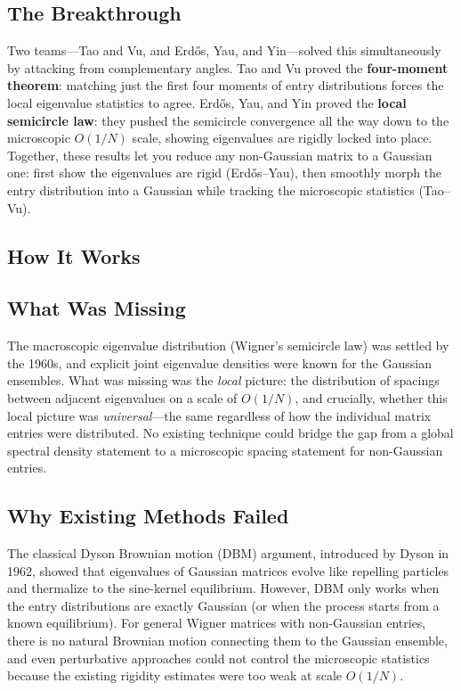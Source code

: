 \subsection{The Breakthrough}
Two teams---Tao and Vu, and Erd\H{o}s, Yau, and Yin---solved this simultaneously by attacking from complementary angles. Tao and Vu proved the \textbf{four-moment theorem}: matching just the first four moments of entry distributions forces the local eigenvalue statistics to agree. Erd\H{o}s, Yau, and Yin proved the \textbf{local semicircle law}: they pushed the semicircle convergence all the way down to the microscopic $O(1/N)$ scale, showing eigenvalues are rigidly locked into place. Together, these results let you reduce any non-Gaussian matrix to a Gaussian one: first show the eigenvalues are rigid (Erd\H{o}s--Yau), then smoothly morph the entry distribution into a Gaussian while tracking the microscopic statistics (Tao--Vu).

\subsection{How It Works}

\subsection{What Was Missing}
The macroscopic eigenvalue distribution (Wigner's semicircle law) was settled by the 1960s, and explicit joint eigenvalue densities were known for the Gaussian ensembles. What was missing was the \emph{local} picture: the distribution of spacings between adjacent eigenvalues on a scale of $O(1/N)$, and crucially, whether this local picture was \emph{universal}---the same regardless of how the individual matrix entries were distributed. No existing technique could bridge the gap from a global spectral density statement to a microscopic spacing statement for non-Gaussian entries.

\subsection{Why Existing Methods Failed}
The classical Dyson Brownian motion (DBM) argument, introduced by Dyson in 1962, showed that eigenvalues of Gaussian matrices evolve like repelling particles and thermalize to the sine-kernel equilibrium. However, DBM only works when the entry distributions are exactly Gaussian (or when the process starts from a known equilibrium). For general Wigner matrices with non-Gaussian entries, there is no natural Brownian motion connecting them to the Gaussian ensemble, and even perturbative approaches could not control the microscopic statistics because the existing rigidity estimates were too weak at scale $O(1/N)$.

